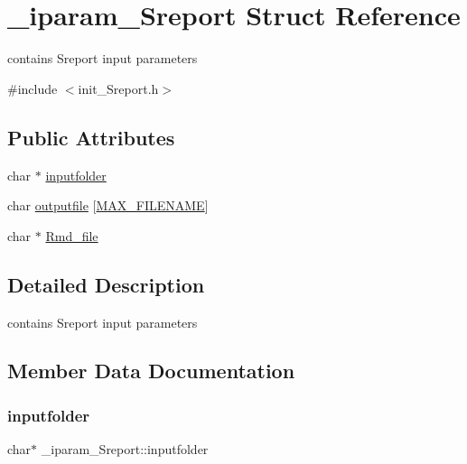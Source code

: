 \hypertarget{struct__iparam__Sreport}{}\section{\+\_\+iparam\+\_\+\+Sreport Struct Reference}
\label{struct__iparam__Sreport}


contains Sreport input parameters  




{\ttfamily \#include $<$init\+\_\+\+Sreport.\+h$>$}

\subsection*{Public Attributes}
\begin{DoxyCompactItemize}
\item 
char $\ast$ \mbox{\hyperlink{struct__iparam__Sreport_af5521a185f440566547b4b11b9fac6a4}{inputfolder}}
\item 
char \mbox{\hyperlink{struct__iparam__Sreport_aab71d9b5647daf65a8ba9ba6f7a35ee5}{outputfile}} \mbox{[}\mbox{\hyperlink{defines_8h_abe0ec333b60117063f9b9fd9f849cb08}{M\+A\+X\+\_\+\+F\+I\+L\+E\+N\+A\+ME}}\mbox{]}
\item 
char $\ast$ \mbox{\hyperlink{struct__iparam__Sreport_a8a234e0192ac0cb671c75ea16a545fa1}{Rmd\+\_\+file}}
\end{DoxyCompactItemize}


\subsection{Detailed Description}
contains Sreport input parameters 

\subsection{Member Data Documentation}
\mbox{\label{struct__iparam__Sreport_af5521a185f440566547b4b11b9fac6a4}} 
\subsubsection{\texorpdfstring{inputfolder}{inputfolder}}
{\footnotesize\ttfamily char$\ast$ \+\_\+iparam\+\_\+\+Sreport\+::inputfolder}

